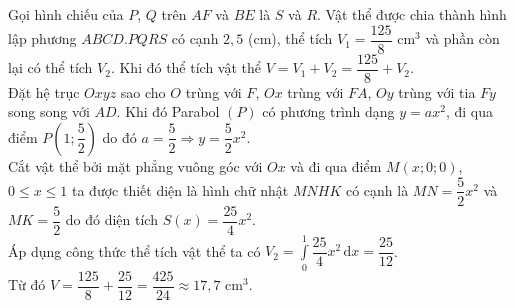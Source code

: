 \begin{ex}
{\begin{center}
\end{center}
Gọi hình chiếu của $P$, $Q$ trên $AF$ và $BE$ là $S$ và $R$. Vật thể được chia thành hình lập phương $ABCD.PQRS$ có cạnh $2{,}5$ (cm), thể tích $V_1=\dfrac{125}{8}$ cm$^3$ và phần còn lại có thể tích $V_2$. Khi đó thể tích vật thể $V=V_1+V_2=\dfrac{125}{8}+V_2$.\\
Đặt hệ trục $Oxyz$ sao cho $O$ trùng với $F$, $Ox$ trùng với $FA$, $Oy$ trùng với tia $Fy$ song song với $AD$. Khi đó Parabol $(P)$ có phương trình dạng $y=ax^2$, đi qua điểm $P\left(1;\dfrac{5}{2}\right)$ do đó $a=\dfrac{5}{2}\Rightarrow y=\dfrac{5}{2}{x^2}$.\\
Cắt vật thể bởi mặt phẳng vuông góc với $Ox$ và đi qua điểm $M(x;0;0)$, $0\le x\le 1$ ta được thiết diện là hình chữ nhật $MNHK$ có cạnh là $ MN=\dfrac{5}{2}x^2$ và $ MK=\dfrac{5}{2}$ do đó diện tích $S(x)=\dfrac{25}{4}x^2$.\\
Áp dụng công thức thể tích vật thể ta có $V_2=\displaystyle\int\limits_0^1\dfrac{25}{4}x^2\mathrm{\,d}x=\dfrac{25}{12}$.\\
Từ đó $V=\dfrac{125}{8}+\dfrac{25}{12}=\dfrac{425}{24}\approx17{,}7$ cm$^3$.
}
\end{ex}


